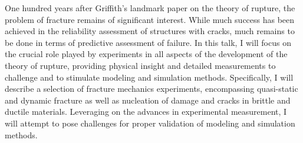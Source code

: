 One hundred years after Griffith’s landmark paper on the theory of rupture, the problem of fracture remains of significant interest. While much success has been achieved in the reliability assessment of structures with cracks, much remains to be done in terms of predictive assessment of failure. In this talk, I will focus on the crucial role played by experiments in all aspects of the development of the theory of rupture, providing physical insight and detailed measurements to challenge and to stimulate modeling and simulation methods. Specifically, I will describe a selection of fracture mechanics experiments, encompassing quasi-static and dynamic fracture as well as nucleation of damage and cracks in brittle and ductile materials. Leveraging on the advances in experimental measurement, I will attempt to pose challenges for proper validation of modeling and simulation methods.
